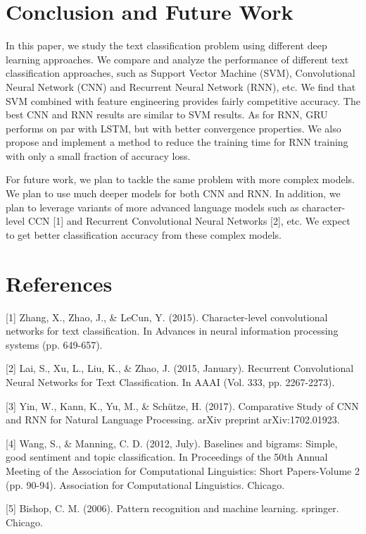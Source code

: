 \documentclass{article}
\begin{document}
\section{Conclusion and Future Work}
In this paper, we study the text classification problem using different deep learning approaches.  We compare and analyze the performance of different text classification approaches, such as Support Vector Machine (SVM), Convolutional Neural Network (CNN) and Recurrent Neural Network (RNN), etc. We find that SVM combined with feature engineering provides fairly competitive accuracy. The best CNN and RNN results are similar to SVM results. As for RNN, GRU performs on par with LSTM, but with better convergence properties. We also propose and implement a method to reduce the training time for RNN training with only a small fraction of accuracy loss.

For future work, we plan to tackle the same problem with more complex models. We plan to use much deeper models for both CNN and RNN. In addition, we plan to leverage variants of more advanced language models such as character-level CCN [1] and Recurrent Convolutional Neural Networks [2], etc. We expect to get better classification accuracy from these complex models.

\section*{References}

\small

[1] Zhang, X., Zhao, J., \& LeCun, Y. (2015). Character-level convolutional networks for text classification. In Advances in neural information processing systems (pp. 649-657).

[2] Lai, S., Xu, L., Liu, K., \& Zhao, J. (2015, January). Recurrent Convolutional Neural Networks for Text Classification. In AAAI (Vol. 333, pp. 2267-2273).

[3] Yin, W., Kann, K., Yu, M., \& Schütze, H. (2017). Comparative Study of CNN and RNN for Natural Language Processing. arXiv preprint arXiv:1702.01923.

[4] Wang, S., \& Manning, C. D. (2012, July). Baselines and bigrams: Simple, good sentiment and topic classification. In Proceedings of the 50th Annual Meeting of the Association for Computational Linguistics: Short Papers-Volume 2 (pp. 90-94). Association for Computational Linguistics. Chicago.

[5] Bishop, C. M. (2006). Pattern recognition and machine learning. springer. Chicago.
\end{document}
